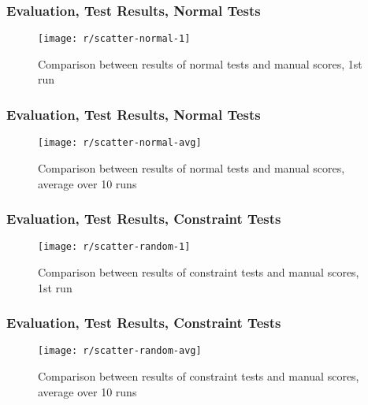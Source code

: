 \begin{frame}\frametitle{Evaluation, Test Results, Normal Tests}
    \begin{figure}
        \begin{minipage}{.85\textwidth}
            \texttt{[image: r/scatter-normal-1]}
            \caption{Comparison between results of normal tests and manual scores, 1st run}
        \end{minipage}
    \end{figure}
\end{frame}

\begin{frame}\frametitle{Evaluation, Test Results, Normal Tests}
    \begin{figure}
        \begin{minipage}{.85\textwidth}
            \texttt{[image: r/scatter-normal-avg]}
            \caption{Comparison between results of normal tests and manual scores, average over 10 runs}
        \end{minipage}
    \end{figure}
\end{frame}

\begin{frame}\frametitle{Evaluation, Test Results, Constraint Tests}
    \begin{figure}
        \begin{minipage}{.85\textwidth}
            \texttt{[image: r/scatter-random-1]}
            \caption{Comparison between results of constraint tests and manual scores, 1st run}
        \end{minipage}
    \end{figure}
\end{frame}

\begin{frame}\frametitle{Evaluation, Test Results, Constraint Tests}
    \begin{figure}
        \begin{minipage}{.85\textwidth}
            \texttt{[image: r/scatter-random-avg]}
            \caption{Comparison between results of constraint tests and manual scores, average over 10 runs}
        \end{minipage}
    \end{figure}
\end{frame}

\begin{frame}
\end{frame}

